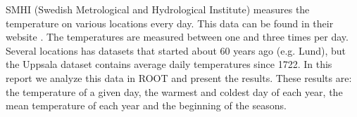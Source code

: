 

SMHI (Swedish Metrological and Hydrological Institute) measures the temperature on various locations every day. This data can be found in their website \cite{smhidata}. The temperatures are measured between one and three times per day. Several locations has datasets that started about 60 years ago (e.g. Lund), but the Uppsala dataset contains average daily temperatures since 1722. In this report we analyze this data in ROOT and present the results. These results are: the temperature of a given day, the warmest and coldest day of each year, the mean temperature of each year and the beginning of the seasons. 


